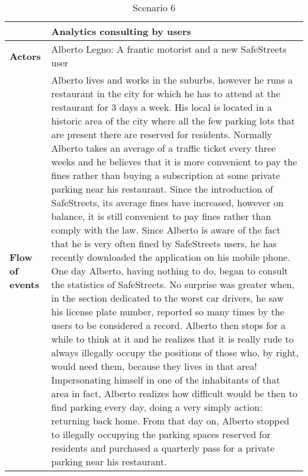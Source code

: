 \begin{table}[!htbp]
	\centering
\begin{tabular}{lp{9.8cm}}
\hline
\bf\large  &\bf\large Analytics consulting by users\\
\hline
\hline

\bf Actors&Alberto Legno: A frantic motorist and a new SafeStreets user\\
\hline
\bf Flow of events&
Alberto lives and works in the suburbs, however he runs a restaurant in the city for which he has to attend at the restaurant for 3 days a week.
His local is located in a historic area of ​​the city where all the few parking lots that are present there are reserved for residents. 
Normally Alberto takes an average of a traffic ticket every three weeks and he believes that it is more convenient to pay the fines rather than buying a subscription at some private parking near his restaurant.
Since the introduction of SafeStreets, its average fines have increased, however on balance, it is still convenient to pay fines rather than comply with the law.
Since Alberto is aware of the fact that he is very often fined by SafeStreets users, he has recently downloaded the application on his mobile phone. One day Alberto, having nothing to do, began to consult the statistics of SafeStreets. No surprise was greater when, in the section dedicated to the worst car drivers, he saw his license plate number, reported so many times by the users to be considered a record.
Alberto then stops for a while to think at it and he realizes that it is really rude to always illegally occupy the positions of those who, by right, would need them, because they lives in that area! Impersonating himself in one of the inhabitants of that area in fact, Alberto realizes how difficult would be then to find parking every day, doing a very simply action: returning back home.
From that day on, Alberto stopped to illegally occupying the parking spaces reserved for residents and purchased a quarterly pass for a private parking near his restaurant.
\end{tabular}
\caption{Scenario 6} 
\label{tab:scenariosix}
\end{table}